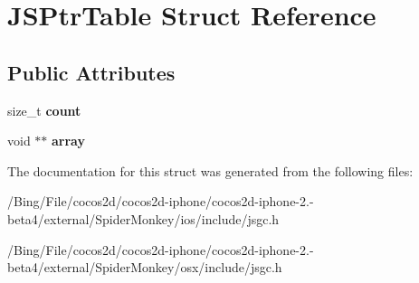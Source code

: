\hypertarget{struct_j_s_ptr_table}{\section{J\-S\-Ptr\-Table Struct Reference}
\label{struct_j_s_ptr_table}
}
\subsection*{Public Attributes}
\begin{DoxyCompactItemize}
\item 
\hypertarget{struct_j_s_ptr_table_ae84fee9c003bee3dfeccd932d9552401}{size\-\_\-t {\bfseries count}}\label{struct_j_s_ptr_table_ae84fee9c003bee3dfeccd932d9552401}

\item 
\hypertarget{struct_j_s_ptr_table_a4f2e412edd0b306bf0320a9a6d920761}{void $\ast$$\ast$ {\bfseries array}}\label{struct_j_s_ptr_table_a4f2e412edd0b306bf0320a9a6d920761}

\end{DoxyCompactItemize}


The documentation for this struct was generated from the following files\-:\begin{DoxyCompactItemize}
\item 
/\-Bing/\-File/cocos2d/cocos2d-\/iphone/cocos2d-\/iphone-\/2.-\/beta4/external/\-Spider\-Monkey/ios/include/jsgc.\-h\item 
/\-Bing/\-File/cocos2d/cocos2d-\/iphone/cocos2d-\/iphone-\/2.-\/beta4/external/\-Spider\-Monkey/osx/include/jsgc.\-h\end{DoxyCompactItemize}
